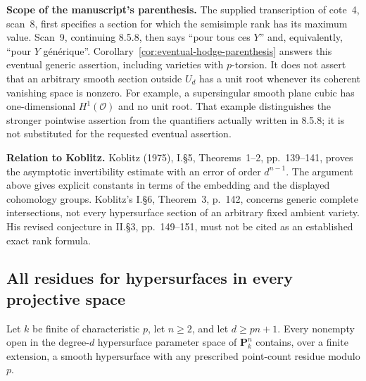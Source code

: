\par\smallskip\noindent\textbf{Scope of the manuscript's parenthesis.}
The supplied transcription of cote~4, scan~8, first specifies a
section for which the semisimple rank has its maximum value.  Scan~9,
continuing 8.5.8, then says ``pour tous ces $Y$'' and, equivalently,
``pour $Y$ g\'en\'erique''.  Corollary~\ref{cor:eventual-hodge-parenthesis}
answers this eventual generic assertion, including varieties with
$p$-torsion.  It does not assert that an arbitrary smooth section
outside $U_d$ has a unit root whenever its coherent vanishing space
is nonzero.  For example, a supersingular smooth plane cubic has
one-dimensional $H^1(\mathcal O)$ and no unit root.  That example
distinguishes the stronger pointwise assertion from the quantifiers
actually written in 8.5.8; it is not substituted for the requested
eventual assertion.

\par\smallskip\noindent\textbf{Relation to Koblitz.}
Koblitz (1975), I.\S5, Theorems~1--2, pp.~139--141, proves the
asymptotic invertibility estimate with an error of order $d^{n-1}$.
The argument above gives explicit constants in terms of the embedding
and the displayed cohomology groups.  Koblitz's I.\S6, Theorem~3,
p.~142, concerns generic complete intersections, not every hypersurface
section of an arbitrary fixed ambient variety.  His revised conjecture
in II.\S3, pp.~149--151, must not be cited as an established exact rank
formula.

\subsection{All residues for hypersurfaces in every projective space}

\begin{theorem}\label{thm:projective-all-residues}
Let $k$ be finite of characteristic $p$, let $n\geq2$, and let
$d\geq pn+1$.  Every nonempty open in the degree-$d$ hypersurface
parameter space of $\mathbf P^n_k$ contains, over a finite extension,
a smooth hypersurface with any prescribed point-count residue
modulo $p$.
\end{theorem}

